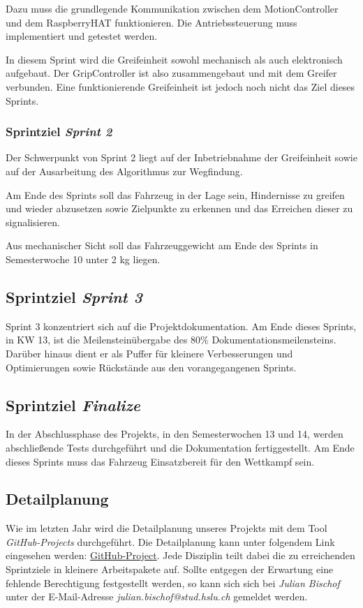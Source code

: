 \documentclass[main.tex]{subfiles} %
\begin{document}
Dazu muss die grundlegende Kommunikation zwischen dem MotionController und dem
RaspberryHAT funktionieren. Die Antriebssteuerung muss implementiert und
getestet werden.

In diesem Sprint wird die Greifeinheit sowohl mechanisch als auch elektronisch
aufgebaut. Der GripController ist also zusammengebaut und mit dem Greifer
verbunden. Eine funktionierende Greifeinheit ist jedoch noch nicht das Ziel
dieses Sprints.

\subsubsection*{Sprintziel \textit{Sprint 2}}
Der Schwerpunkt von Sprint 2 liegt auf der Inbetriebnahme der Greifeinheit sowie
auf der Ausarbeitung des Algorithmus zur Wegfindung.

Am Ende des Sprints soll das Fahrzeug in der Lage sein, Hindernisse zu greifen
und wieder abzusetzen sowie Zielpunkte zu erkennen und das Erreichen dieser zu
signalisieren.

Aus mechanischer Sicht soll das Fahrzeuggewicht am Ende des Sprints in
Semesterwoche 10 unter 2 kg liegen.

\subsection*{Sprintziel \textit{Sprint 3}}
Sprint 3 konzentriert sich auf die Projektdokumentation. Am Ende dieses Sprints,
in KW 13, ist die Meilensteinübergabe des 80\% Dokumentationsmeilensteins. Darüber
hinaus dient er als Puffer für kleinere Verbesserungen und Optimierungen sowie
Rückstände aus den vorangegangenen Sprints.

\subsection*{Sprintziel \textit{Finalize}}
In der Abschlussphase des Projekts, in den Semesterwochen 13 und 14, werden
abschließende Tests durchgeführt und die Dokumentation fertiggestellt. Am Ende
dieses Sprints muss das Fahrzeug Einsatzbereit für den Wettkampf sein.

\subsection{Detailplanung}
Wie im letzten Jahr wird die Detailplanung unseres Projekts mit dem Tool
\textit{GitHub-Projects} durchgeführt. Die Detailplanung kann unter folgendem
Link eingesehen werden:
\href{https://github.com/users/JulesBischof/projects/6/views/4}{GitHub-Project}.
Jede Disziplin teilt dabei die zu erreichenden Sprintziele in kleinere
Arbeitspakete auf. Sollte entgegen der Erwartung eine fehlende Berechtigung
festgestellt werden, so kann sich sich bei \textit{Julian Bischof} unter der
E-Mail-Adresse \textit{julian.bischof@stud.hslu.ch} gemeldet werden.
\end{document}

